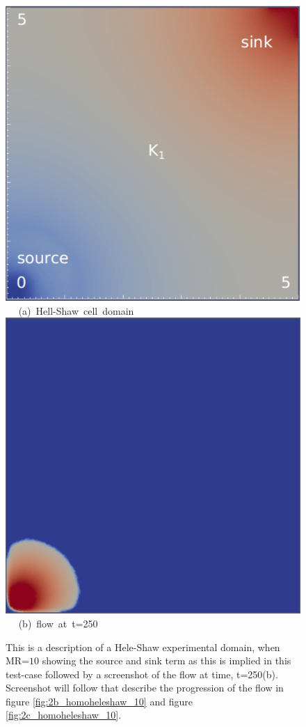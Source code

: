 \begin{figure}[ht] 
\vbox{
\hbox{\hspace{2.5cm}
\includegraphics[width=.6\textwidth]{./Pics1/Saffman_homogeneous/saffman_homo_fixed_1.pdf} 
}
\vspace{0.0cm}
\hbox{\hspace{4.5cm} (a) Hell-Shaw cell domain   
}
\vspace{0.25cm}
\hbox{\hspace{2.5cm}
\includegraphics[width=.6\textwidth]{./Pics1/Saffman_homogeneous/saffman_homo_fixed_250_1.pdf}
}
\vspace{0.0cm}
\hbox{\hspace{5.0cm} (b) flow at t=250  
}
}     
\caption{This is a description of a Hele-Shaw experimental domain, when MR=$10$ showing the source and sink term as this is implied in this test-case followed by a screenshot of the flow at time, t=250(b). Screenshot will follow that describe the progression of the flow in figure \ref{fig:2b_homoheleshaw_10} and figure \ref{fig:2c_homoheleshaw_10}.}
\label{fig:2a_homoheleshaw_10}
\end{figure}
\clearpage

